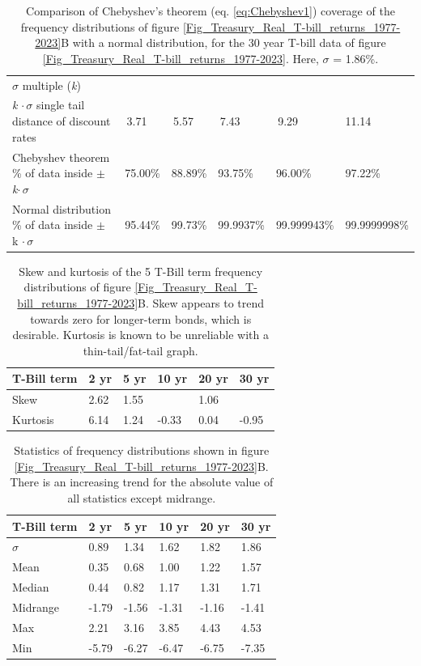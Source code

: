 \documentclass{article}
\begin{document}
\begin{table}[hbt!]
\caption{Comparison of Chebyshev's theorem (eq. \ref{eq:Chebyshev1}) coverage of the frequency distributions of figure \ref{Fig_Treasury_Real_T-bill_returns_1977-2023}B with a normal distribution, for the 30 year T-bill data of figure \ref{Fig_Treasury_Real_T-bill_returns_1977-2023}. Here, $\sigma$ = 1.86\%.  } 
\begin{tabular}{llllll}
$\sigma$ multiple (\textit{k})                           & \quad2       & \quad3       & \quad4         & \quad5           & \quad6            \\
\textit{k} $ \cdot \, \sigma$ single tail distance of discount rates        & \;\,3.71    & \;\,5.57    & \;\,7.43      & \;\,9.29        & 11.14        \\
Chebyshev theorem \% of data inside $\pm$ \textit{k}$\cdot \, \sigma$           & 75.00\% & 88.89\% & 93.75\%   & 96.00\%     & 97.22\%      \\
Normal distribution \% of data inside $\pm$ k $\cdot \, \sigma$ & 95.44\% & 99.73\% & 99.9937\% & 99.999943\% & 99.9999998\%
\end{tabular}
 \label{TableT_Bill}
\end{table}

\begin{table}[!hbt]
\caption{Skew and kurtosis of the 5 T-Bill  term frequency distributions of figure \ref{Fig_Treasury_Real_T-bill_returns_1977-2023}B. Skew appears to trend towards zero for longer-term bonds, which is desirable. Kurtosis is known to be unreliable with a thin-tail/fat-tail graph.}
\begin{tabular}{llllll}
 T-Bill term        & 2 yr & 5 yr & 10 yr & 20 yr & 30 yr \\ \hline 
Skew     & 2.62             & 1.55             & \;1.05              & 1.06              & \;0.72              \\
Kurtosis & 6.14             & 1.24             & -0.33             & 0.04              & -0.95            
\end{tabular} 
\label{TableT_Bill_Freq_Skew_Kurtosis}
\end{table}

\begin{table}[hbt!]
\caption{Statistics of frequency distributions shown in figure \ref{Fig_Treasury_Real_T-bill_returns_1977-2023}B. There is an increasing trend for the absolute value of all statistics except midrange. } 
\begin{tabular}{llllll}
T-Bill term & 2 yr  & 5 yr  & 10 yr & 20 yr & 30 yr \\ \hline
$\sigma$    & 0.89  & 1.34  & 1.62  & 1.82  & 1.86  \\
Mean        & 0.35  & 0.68  & 1.00  & 1.22  & 1.57  \\
Median      & 0.44  & 0.82  & 1.17  & 1.31  & 1.71  \\
Midrange    & -1.79 & -1.56 & -1.31 & -1.16 & -1.41 \\
Max         & 2.21  & 3.16  & 3.85  & 4.43  & 4.53  \\
Min         & -5.79 & -6.27 & -6.47 & -6.75 & -7.35
\end{tabular}
 \label{TableT_Bill-Stats}
\end{table}
\end{document}
